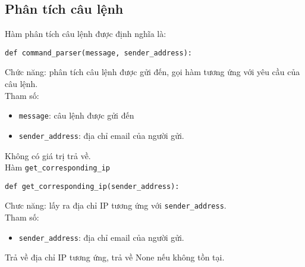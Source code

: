 \subsection{Phân tích câu lệnh}
Hàm phân tích câu lệnh được định nghĩa là:
\begin{lstlisting}
def command_parser(message, sender_address):
\end{lstlisting}
Chức năng: phân tích câu lệnh được gửi đến, gọi hàm tương ứng với yêu cầu của câu lệnh.\\
Tham số:
\begin{itemize}
\item \lstinline{message}: câu lệnh được gửi đến
\item \lstinline{sender_address}: địa chỉ email của người gửi.
\end{itemize}
Không có giá trị trả về.\\

Hàm \lstinline{get_corresponding_ip}
\begin{lstlisting}
def get_corresponding_ip(sender_address):
\end{lstlisting}
Chưc năng: lấy ra địa chỉ IP tương ứng với \lstinline{sender_address}.\\
Tham số:
\begin{itemize}
\item \lstinline{sender_address}: địa chỉ email của người gửi.
\end{itemize}
Trả về địa chỉ IP tương ứng, trả về None nếu không tồn tại.